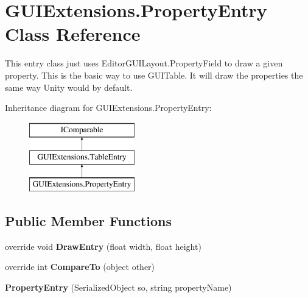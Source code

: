 \hypertarget{class_g_u_i_extensions_1_1_property_entry}{}\section{G\+U\+I\+Extensions.\+Property\+Entry Class Reference}
\label{class_g_u_i_extensions_1_1_property_entry}


This entry class just uses Editor\+G\+U\+I\+Layout.\+Property\+Field to draw a given property. This is the basic way to use G\+U\+I\+Table. It will draw the properties the same way Unity would by default.  


Inheritance diagram for G\+U\+I\+Extensions.\+Property\+Entry\+:\begin{figure}[H]
\begin{center}
\leavevmode
\includegraphics[height=3.000000cm]{class_g_u_i_extensions_1_1_property_entry}
\end{center}
\end{figure}
\subsection*{Public Member Functions}
\begin{DoxyCompactItemize}
\item 
\mbox{\label{class_g_u_i_extensions_1_1_property_entry_a30717a2d99776193e1aaea13de2eb517}} 
override void {\bfseries Draw\+Entry} (float width, float height)
\item 
\mbox{\label{class_g_u_i_extensions_1_1_property_entry_a38fa06c9db5fb809e819b32e5f6364de}} 
override int {\bfseries Compare\+To} (object other)
\item 
\mbox{\label{class_g_u_i_extensions_1_1_property_entry_a10e29d4bb2e12a2f761c801999a732c2}} 
{\bfseries Property\+Entry} (Serialized\+Object so, string property\+Name)
\end{DoxyCompactItemize}
